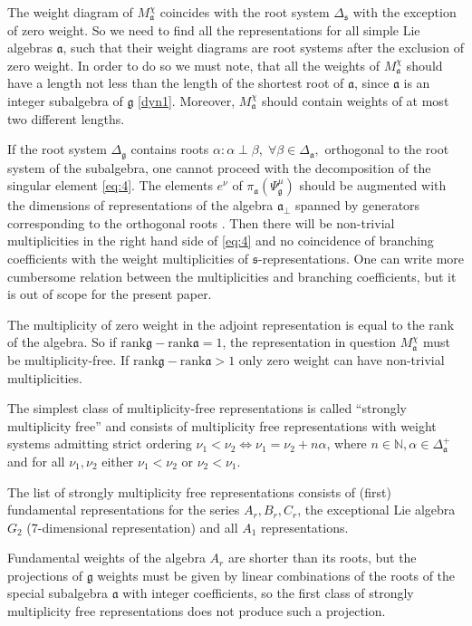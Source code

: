 \documentclass[12pt]{iopart}
\newcommand{\pia}{\pi_{\mathfrak{a}}}
\newcommand{\gf}{\mathfrak{g}}
\newcommand{\af}{\mathfrak{a}}
\newcommand{\afb}{\mathfrak{a}_{\bot}}
\newcommand{\sfr}{\mathfrak{s}}
\begin{document}
The weight diagram of $M^{\chi}_{\af}$ coincides with the root system $\Delta_{\sfr}$ with the exception of
zero weight. So we need to find all the representations for all simple Lie algebras $\af$, such that
their weight diagrams are root systems after the exclusion of zero weight. In order to do so we must
note, that all the weights of $M^{\chi}_{\af}$ should have a length not less than the length of the shortest
root of $\af$, since $\af$ is an integer subalgebra of $\gf$ \ref{dyn1}. Moreover, $M^{\chi}_{\af}$
should contain weights of at most two different lengths. 

If the root system $\Delta_{\gf}$ contains roots $\alpha: \alpha\perp \beta,\; \forall \beta\in
\Delta_{\af},$ orthogonal to the root system of the subalgebra, one cannot proceed with the decomposition
of the singular element \ref{eq:4}. The elements $e^{\nu}$ of $\pia\left(\Psi^{\mu}_{\gf}\right)$
should be augmented with the dimensions of representations of the algebra $\afb$ spanned by generators
corresponding to the orthogonal roots \cite{2010arXiv1007.0318L}. Then there will be non-trivial
multiplicities in the right hand side of \ref{eq:4} and no coincidence of branching coefficients
with the weight multiplicities of $\sfr$-representations. One can write more cumbersome relation between
the multiplicities and branching coefficients, but it is out of scope for the present paper.

The multiplicity of zero weight in the adjoint representation is equal to the rank of the algebra. So if
$\mathrm{rank}\gf-\mathrm{rank}\af=1$, the representation in question $M^{\chi}_{\af}$ must be
multiplicity-free. If $\mathrm{rank}\gf-\mathrm{rank}\af>1$ only zero weight can have non-trivial
multiplicities. 

The simplest class of multiplicity-free representations is called ``strongly multiplicity free''
\cite{lehrer2006strongly} and consists of multiplicity free representations with weight systems
admitting strict ordering $\nu_{1}<\nu_{2} \Leftrightarrow \nu_{1}=\nu_{2}+n \alpha$, where $n\in
\mathbb{N}, \alpha\in \Delta^{+}_{\af}$ and for all $\nu_{1},\nu_{2}$ either $\nu_{1}<\nu_{2}$ or
$\nu_{2}<\nu_{1}$.

The list of strongly multiplicity free representations consists of (first) fundamental representations
for the series $A_{r}, B_{r}, C_{r}$, the exceptional Lie algebra $G_{2}$ (7-dimensional representation) and
all $A_{1}$ representations. 

Fundamental weights of the algebra $A_{r}$ are shorter than its roots, but the projections of $\gf$
weights must be given by linear combinations of the roots of the  special subalgebra $\af$ with integer
coefficients, so the first class of strongly multiplicity free representations does not produce such a
projection. 
\end{document}

